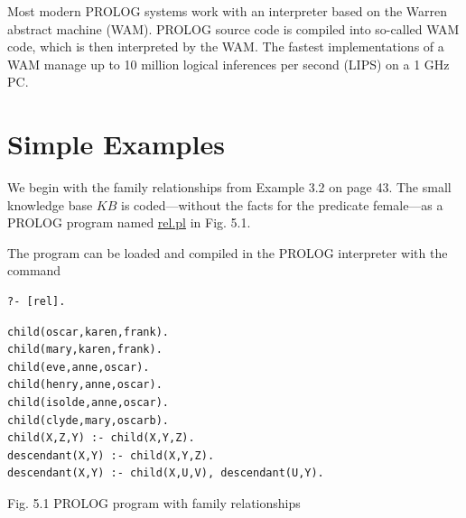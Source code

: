 \documentclass[10pt]{book}
\begin{document}
Most modern PROLOG systems work with an interpreter based on the Warren abstract machine (WAM). PROLOG source code is compiled into so-called WAM code, which is then interpreted by the WAM. The fastest implementations of a WAM manage up to 10 million logical inferences per second (LIPS) on a 1 GHz PC.

\section{Simple Examples}
We begin with the family relationships from Example 3.2 on page 43. The small knowledge base $K B$ is coded—without the facts for the predicate female—as a PROLOG program named \href{http://rel.pl}{rel.pl} in Fig. 5.1.

The program can be loaded and compiled in the PROLOG interpreter with the command
\begin{verbatim}
?- [rel].
\end{verbatim}

\begin{verbatim}
child(oscar,karen,frank).
child(mary,karen,frank).
child(eve,anne,oscar).
child(henry,anne,oscar).
child(isolde,anne,oscar).
child(clyde,mary,oscarb).
child(X,Z,Y) :- child(X,Y,Z).
descendant(X,Y) :- child(X,Y,Z).
descendant(X,Y) :- child(X,U,V), descendant(U,Y).
\end{verbatim}

Fig. 5.1 PROLOG program with family relationships
\end{document}
